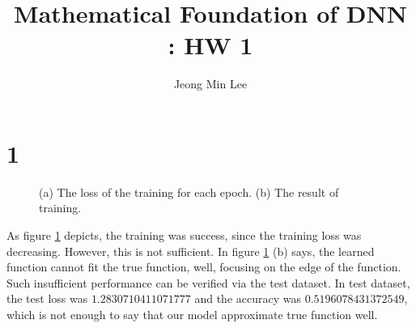\documentclass[10pt]{article}
\title{\textbf{Mathematical Foundation of DNN : HW 1}}
\author{Jeong Min Lee}
\begin{document}
\maketitle

\section*{1}
\begin{figure}[!h]
    \begin{center}
    \end{center}
    \caption{(a) The loss of the training for each epoch. (b) The result of training.}
    \label{fig1}
\end{figure}
As figure \ref{fig1} depicts, the training was success, since the training loss was decreasing. However, this is not sufficient. 
In figure \ref{fig1} (b) says, the learned function cannot fit the true function, well, focusing on the edge of the function. 
Such insufficient performance can be verified via the test dataset. In test dataset, the test loss was $1.2830710411071777$ and the accuracy was $0.5196078431372549$, which is not enough to say that our model approximate true function well. 
\end{document}
